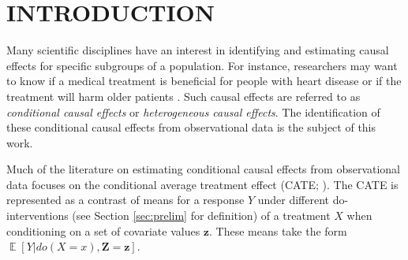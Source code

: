 \documentclass[twoside]{article}
\DeclareMathOperator{\E}{\mathbb{E}}
\newcommand{\mb}[1]{\mathbf{#1}}
\begin{document}




\begin{abstract}
We consider the problem of identifying a conditional causal effect through covariate adjustment. We focus on the setting where the causal graph is known up to one of two types of graphs: a maximally oriented partially directed acyclic graph (MPDAG) or a partial ancestral graph (PAG). Both MPDAGs and PAGs represent equivalence classes of possible underlying causal models. After defining adjustment sets in this setting, we provide a necessary and sufficient graphical criterion -- the \textit{conditional adjustment criterion} -- for finding these sets under conditioning on variables unaffected by treatment. We further provide explicit sets from the graph that satisfy the conditional adjustment criterion, and therefore, can be used as adjustment sets for conditional causal effect identification.
\end{abstract}









\section{INTRODUCTION}
\label{sec:intro}

Many scientific disciplines have an interest in identifying and estimating causal effects for specific subgroups of a population. For instance, researchers may want to know if a medical treatment is beneficial for people with heart disease or if the treatment will harm older patients \citep{brand2010benefits, world2010medical}. Such causal effects are referred to as \textit{conditional causal effects} or \textit{heterogeneous causal effects}. The identification of these conditional causal effects from observational data is the subject of this work. 

Much of the literature on estimating conditional causal effects from observational data focuses on the conditional average treatment effect (CATE; \citealp{athey2016recursive, wager2018estimation, kunzel2019metalearners, nie2021quasi, kennedy2022minimax}). The CATE is represented as a contrast of means for a response $Y$ under different do-interventions (see Section \ref{sec:prelim} for definition) of a treatment $X$ when conditioning on a set of covariate values $\mb{z}$. These means take the form $\E[Y | do(X=x), \mb{Z} = \mb{z}]$.
\end{document}
